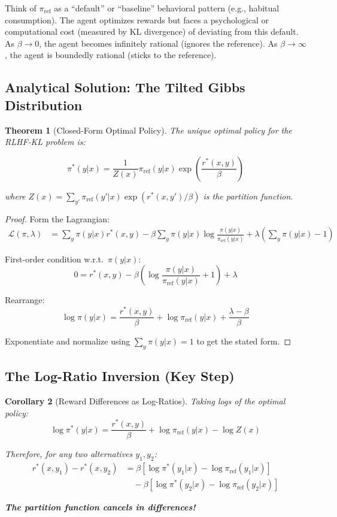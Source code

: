 \documentclass[11pt]{article}
\newcommand{\1}{\mathbf{1}}
\theoremstyle{plain}
\newtheorem{theorem}{Theorem}
\newtheorem{corollary}[theorem]{Corollary}
\theoremstyle{definition}
\theoremstyle{remark}
\begin{document}
\begin{econintuition}
Think of $\pi_{\text{ref}}$ as a ``default'' or ``baseline'' behavioral pattern (e.g., habitual consumption). The agent optimizes rewards but faces a psychological or computational cost (measured by KL divergence) of deviating from this default. As $\beta \to 0$, the agent becomes infinitely rational (ignores the reference). As $\beta \to \infty$, the agent is boundedly rational (sticks to the reference).
\end{econintuition}

\subsection*{Analytical Solution: The Tilted Gibbs Distribution}

\begin{theorem}[Closed-Form Optimal Policy]
The unique optimal policy for the RLHF-KL problem is:

$$
\pi^*(y|x) = \frac{1}{Z(x)} \pi_{\text{ref}}(y|x) \exp\left(\frac{r^*(x,y)}{\beta}\right)
$$

where $Z(x) = \sum_{y'} \pi_{\text{ref}}(y'|x) \exp(r^*(x,y')/\beta)$ is the partition function.
\end{theorem}

\begin{proof}
Form the Lagrangian:
\begin{align*}
\mathcal{L}(\pi, \lambda) &= \sum_y \pi(y|x) r^*(x,y) - \beta \sum_y \pi(y|x) \log \frac{\pi(y|x)}{\pi_{\text{ref}}(y|x)} + \lambda \left(\sum_y \pi(y|x) - 1\right)
\end{align*}

First-order condition w.r.t.\ $\pi(y|x)$:
$$
0 = r^*(x,y) - \beta \left(\log \frac{\pi(y|x)}{\pi_{\text{ref}}(y|x)} + 1\right) + \lambda
$$

Rearrange:
$$
\log \pi(y|x) = \frac{r^*(x,y)}{\beta} + \log \pi_{\text{ref}}(y|x) + \frac{\lambda - \beta}{\beta}
$$

Exponentiate and normalize using $\sum_y \pi(y|x) = 1$ to get the stated form.
\end{proof}

\subsection*{The Log-Ratio Inversion (Key Step)}

\begin{corollary}[Reward Differences as Log-Ratios]
Taking logs of the optimal policy:
$$
\log \pi^*(y|x) = \frac{r^*(x,y)}{\beta} + \log \pi_{\text{ref}}(y|x) - \log Z(x)
$$

Therefore, for any two alternatives $y_1, y_2$:
\begin{align*}
r^*(x,y_1) - r^*(x,y_2) &= \beta \left[\log \pi^*(y_1|x) - \log \pi_{\text{ref}}(y_1|x)\right] \\
&\quad - \beta \left[\log \pi^*(y_2|x) - \log \pi_{\text{ref}}(y_2|x)\right]
\end{align*}

\textbf{The partition function cancels in differences!}
\end{corollary}
\end{document}
